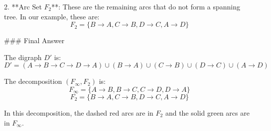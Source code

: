 2. **Arc Set \( F_2 \)**: These are the remaining arcs that do not form a spanning tree. In our example, these are:
   \[ F_2 = \{ B \to A, C \to B, D \to C, A \to D \} \]

### Final Answer

The digraph \( D' \) is:
\[ D' = (A \to B \to C \to D \to A) \cup (B \to A) \cup (C \to B) \cup (D \to C) \cup (A \to D) \]

The decomposition \( (F_\infty, F_2) \) is:
\[ F_\infty = \{ A \to B, B \to C, C \to D, D \to A \} \]
\[ F_2 = \{ B \to A, C \to B, D \to C, A \to D \} \]

In this decomposition, the dashed red arcs are in \( F_2 \) and the solid green arcs are in \( F_\infty \).